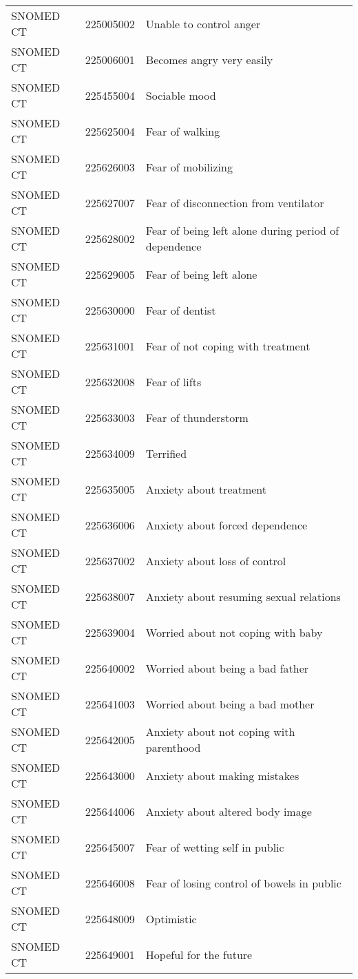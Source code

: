 \begin{longtable}{p{}p{}p{}}
  SNOMED CT & 225005002 & Unable to control anger \\ 
  SNOMED CT & 225006001 & Becomes angry very easily \\ 
  SNOMED CT & 225455004 & Sociable mood \\ 
  SNOMED CT & 225625004 & Fear of walking \\ 
  SNOMED CT & 225626003 & Fear of mobilizing \\ 
  SNOMED CT & 225627007 & Fear of disconnection from ventilator \\ 
  SNOMED CT & 225628002 & Fear of being left alone during period of dependence \\ 
  SNOMED CT & 225629005 & Fear of being left alone \\ 
  SNOMED CT & 225630000 & Fear of dentist \\ 
  SNOMED CT & 225631001 & Fear of not coping with treatment \\ 
  SNOMED CT & 225632008 & Fear of lifts \\ 
  SNOMED CT & 225633003 & Fear of thunderstorm \\ 
  SNOMED CT & 225634009 & Terrified \\ 
  SNOMED CT & 225635005 & Anxiety about treatment \\ 
  SNOMED CT & 225636006 & Anxiety about forced dependence \\ 
  SNOMED CT & 225637002 & Anxiety about loss of control \\ 
  SNOMED CT & 225638007 & Anxiety about resuming sexual relations \\ 
  SNOMED CT & 225639004 & Worried about not coping with baby \\ 
  SNOMED CT & 225640002 & Worried about being a bad father \\ 
  SNOMED CT & 225641003 & Worried about being a bad mother \\ 
  SNOMED CT & 225642005 & Anxiety about not coping with parenthood \\ 
  SNOMED CT & 225643000 & Anxiety about making mistakes \\ 
  SNOMED CT & 225644006 & Anxiety about altered body image \\ 
  SNOMED CT & 225645007 & Fear of wetting self in public \\ 
  SNOMED CT & 225646008 & Fear of losing control of bowels in public \\ 
  SNOMED CT & 225648009 & Optimistic \\ 
  SNOMED CT & 225649001 & Hopeful for the future \\ 

\end{longtable}
